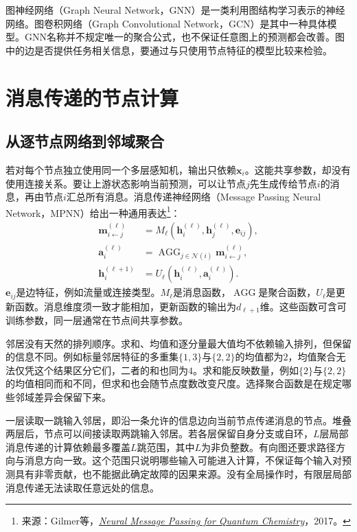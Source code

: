 图神经网络（Graph Neural Network，GNN）是一类利用图结构学习表示的神经网络。图卷积网络（Graph Convolutional Network，GCN）是其中一种具体模型。GNN名称并不规定唯一的聚合公式，也不保证任意图上的预测都会改善。图中的边是否提供任务相关信息，要通过与只使用节点特征的模型比较来检验。

\section{消息传递的节点计算}
\subsection{从逐节点网络到邻域聚合}
若对每个节点独立使用同一个多层感知机，输出只依赖$\bm x_i$。这能共享参数，却没有使用连接关系。要让上游状态影响当前预测，可以让节点$j$先生成传给节点$i$的消息，再由节点$i$汇总所有消息。消息传递神经网络（Message Passing Neural Network，MPNN）给出一种通用表达\footnote{来源：Gilmer等，\href{https://arxiv.org/abs/1704.01212}{\textit{Neural Message Passing for Quantum Chemistry}}，2017。}：
\begin{align}
 \bm m_{i\leftarrow j}^{(\ell)}&=M_\ell(\bm h_i^{(\ell)},\bm h_j^{(\ell)},\bm e_{ij}),\label{eq:graph-message-function}\\
 \bm a_i^{(\ell)}&=\operatorname{AGG}_{j\in\mathcal N(i)}\bm m_{i\leftarrow j}^{(\ell)},\\
 \bm h_i^{(\ell+1)}&=U_\ell(\bm h_i^{(\ell)},\bm a_i^{(\ell)}).
 \label{eq:graph-message-passing}
\end{align}
$\bm e_{ij}$是边特征，例如流量或连接类型。$M_\ell$是消息函数，$\operatorname{AGG}$是聚合函数，$U_\ell$是更新函数。消息维度须一致才能相加，更新函数的输出为$d_{\ell+1}$维。这些函数可含可训练参数，同一层通常在节点间共享参数。

邻居没有天然的排列顺序。求和、均值和逐分量最大值均不依赖输入排列，但保留的信息不同。例如标量邻居特征的多重集$\{1,3\}$与$\{2,2\}$的均值都为$2$，均值聚合无法仅凭这个结果区分它们，二者的和也同为$4$。求和能反映数量，例如$\{2\}$与$\{2,2\}$的均值相同而和不同，但求和也会随节点度数改变尺度。选择聚合函数是在规定哪些邻域差异会保留下来。

一层读取一跳输入邻居，即沿一条允许的信息边向当前节点传递消息的节点。堆叠两层后，节点可以间接读取两跳输入邻居。若各层保留自身分支或自环，$L$层局部消息传递的计算依赖最多覆盖$L$跳范围，其中$L$为非负整数。有向图还要求路径方向与消息方向一致。这个范围只说明哪些输入可能进入计算，不保证每个输入对预测具有非零贡献，也不能据此确定故障的因果来源。没有全局操作时，有限层局部消息传递无法读取任意远处的信息。


